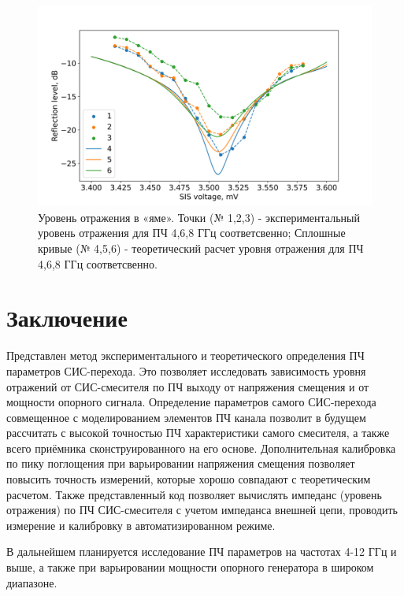 \documentclass[a4paper]{article}
\begin{document}
\begin{figure}[H]
    \centering
    \includegraphics[scale=0.5]{load_imp.png}
    \caption{Уровень отражения в «яме». Точки (№ 1,2,3) - экспериментальный уровень отражения для ПЧ 4,6,8 ГГц соответсвенно; Сплошные кривые (№ 4,5,6) - теоретический расчет уровня отражения для ПЧ 4,6,8 ГГц соответсвенно.}
    \label{pic-load_imp}
\end{figure}


\newpage
\section{Заключение}
Представлен метод экспериментального и теоретического определения ПЧ параметров СИС-перехода. Это позволяет исследовать зависимость уровня отражений от СИС-смесителя по ПЧ выходу от напряжения смещения и от мощности опорного сигнала. Определение параметров самого СИС-перехода совмещенное с моделированием элементов ПЧ канала позволит в будущем рассчитать с высокой точностью ПЧ характеристики самого смесителя, а также всего приёмника сконструированного на его основе. Дополнительная калибровка по пику поглощения при варьировании напряжения смещения позволяет повысить точность измерений, которые хорошо совпадают с теоретическим расчетом. Также представленный код позволяет вычислять импеданс (уровень отражения) по ПЧ СИС-смесителя с учетом импеданса внешней цепи, проводить измерение и калибровку в автоматизированном режиме. \par 

В дальнейшем планируется исследование ПЧ параметров на частотах 4-12 ГГц и выше, а также при варьировании мощности опорного генератора в широком диапазоне.
\end{document}
